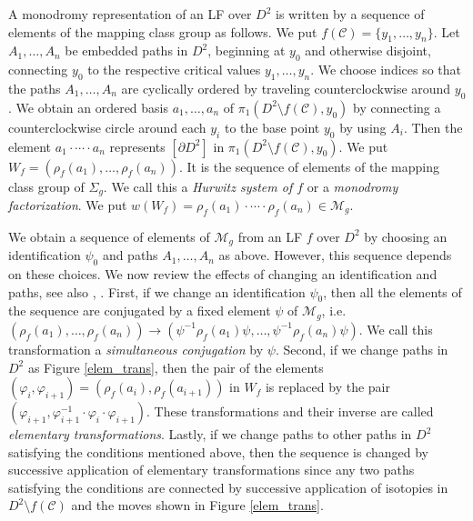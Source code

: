 \documentclass{amsart}
\theoremstyle{plain}
\theoremstyle{definition}
\begin{document}
A monodromy representation of an LF over $D^2$ is written by a sequence of elements of the mapping class group as follows. 
We put $f(\mathcal{C})=\{y_1,\ldots,y_n\}$.
Let $A_1,\ldots,A_n$ be embedded paths in $D^2$, beginning at $y_0$ and otherwise disjoint, 
connecting $y_0$ to the respective critical values $y_1,\ldots,y_n$. 
We choose indices so that the paths $A_1,\ldots,A_n$ are cyclically ordered by traveling counterclockwise around $y_0$. 
We obtain an ordered basis $a_1,\ldots,a_n$ of $\pi_1(D^2\setminus f(\mathcal{C}),y_0)$ by connecting a counterclockwise circle around each $y_i$ to the base point $y_0$ by using $A_i$. 
Then the element $a_1\cdot\cdots\cdot a_n$ represents $[\partial D^2]$ in $\pi_1(D^2\setminus f(\mathcal{C}),y_0)$. 
We put $W_f=(\rho_f(a_1),\ldots,\rho_f(a_n))$. 
It is the sequence of elements of the mapping class group of $\Sigma_g$. 
We call this a {\it Hurwitz system of $f$} or a {\it monodromy factorization}. 
We put $w(W_f)=\rho_f(a_1)\cdot\cdots\cdot\rho_f(a_n)\in \mathcal{M}_g$. 

\par

We obtain a sequence of elements of $\mathcal{M}_g$ from an LF $f$ over $D^2$ 
by choosing an identification $\psi_0$ and paths $A_1,\ldots,A_n$ as above. 
However, this sequence depends on these choices. 
We now review the effects of changing an identification and paths, see also \cite{GS}, \cite{Matsumoto2}. 
First, if we change an identification $\psi_0$, then all the elements of the sequence are conjugated by a fixed element $\psi$ of $\mathcal{M}_g$, 
i.e.$(\rho_f(a_1),\ldots,\rho_f(a_n))\rightarrow (\psi^{-1}\rho_f(a_1)\psi,\ldots,\psi^{-1}\rho_f(a_n)\psi)$. 
We call this transformation a {\it simultaneous conjugation} by $\psi$. 
Second, if we change paths in $D^2$ as Figure \ref{elem_trans}, 
then the pair of the elements $(\varphi_i,\varphi_{i+1})=(\rho_f(a_i),\rho_f(a_{i+1}))$ in $W_f$ is replaced by the pair $(\varphi_{i+1},\varphi_{i+1}^{-1}\cdot\varphi_i\cdot\varphi_{i+1})$. 
These transformations and their inverse are called {\it elementary transformations}. 
Lastly, if we change paths to other paths in $D^2$ satisfying the conditions mentioned above, 
then the sequence is changed by successive application of elementary transformations 
since any two paths satisfying the conditions are connected by successive application of isotopies in $D^2\setminus f(\mathcal{C})$ and the moves shown in Figure \ref{elem_trans}. 
\end{document}
